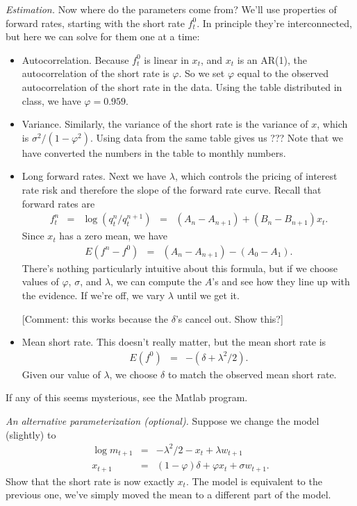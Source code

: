 \documentclass[11pt]{article}
\begin{document}
{\it Estimation.\/}
Now where do the parameters come from?
We'll use properties of forward rates, starting with the short rate $f^0_t$.
In principle they're interconnected, but here we can solve for them one at a time:
%
\begin{itemize}
\item Autocorrelation.  Because $f^0_t$ is linear in $x_t$, and $x_t$ is an AR(1),
the autocorrelation of the short rate is $\varphi$.
So we set $\varphi$ equal to the observed autocorrelation of the short rate in the data.
Using the table distributed in class, we have $\varphi = 0.959$.

\item Variance.  Similarly, the variance of the short rate is the variance of $x$,
which is $ \sigma^2/(1-\varphi^2)$.
Using data from the same table gives us ???
Note that we have converted the numbers in the table to monthly numbers.

\item Long forward rates.  Next we have $\lambda$, which controls the pricing of
interest rate risk and therefore the slope of the forward rate curve.
Recall that forward rates are
\begin{eqnarray*}
    f^n_t &=& \log (q^n_t/q^{n+1}_t)
                \;\;=\;\;  (A_n - A_{n+1}) + (B_n - B_{n+1}) x_t .
\end{eqnarray*}
Since $x_t$ has a zero mean,  we have
\begin{eqnarray*}
    E (f^n - f^0) &=&  (A_n - A_{n+1}) - (A_0 - A_{1}) .
\end{eqnarray*}
There's nothing particularly intuitive about this formula,
but if we choose values of $\varphi$, $\sigma$, and $\lambda$,
we can compute the $A$'s and see how they line up with the evidence.
If we're off, we vary $\lambda$ until we get it.

[Comment:  this works because the $\delta$'s cancel out.  Show this?]

\item Mean short rate.  This doesn't really matter, but
the mean short rate is
\begin{eqnarray*}
    E (f^0) &=&  - (\delta + \lambda^2/2) .
\end{eqnarray*}
Given our value of $\lambda$, we choose $\delta$ to match
the observed mean short rate.

\end{itemize}
If any of this seems mysterious, see the Matlab program.


{\it An alternative parameterization (optional).\/}
Suppose we change the model (slightly) to
\begin{eqnarray*}
    \log m_{t+1} &=& - \lambda^2/2 - x_t + \lambda w_{t+1} \\
         x_{t+1} &=& (1-\varphi) \delta + \varphi x_t + \sigma w_{t+1} .
\end{eqnarray*}
Show that the short rate is now exactly $x_t$.
The model is equivalent to the previous one,
we've simply moved the mean to a different part of the model.
\end{document}
